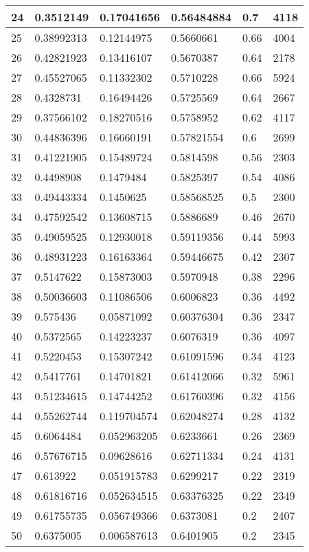 \begin{longtable}{|l|l|l|l|l|l|}
24 & 0.3512149 & 0.17041656 & 0.56484884 & 0.7 & 4118 \\ \hline 
25 & 0.38992313 & 0.12144975 & 0.5660661 & 0.66 & 4004 \\ \hline 
26 & 0.42821923 & 0.13416107 & 0.5670387 & 0.64 & 2178 \\ \hline 
27 & 0.45527065 & 0.11332302 & 0.5710228 & 0.66 & 5924 \\ \hline 
28 & 0.4328731 & 0.16494426 & 0.5725569 & 0.64 & 2667 \\ \hline 
29 & 0.37566102 & 0.18270516 & 0.5758952 & 0.62 & 4117 \\ \hline 
30 & 0.44836396 & 0.16660191 & 0.57821554 & 0.6 & 2699 \\ \hline 
31 & 0.41221905 & 0.15489724 & 0.5814598 & 0.56 & 2303 \\ \hline 
32 & 0.4498908 & 0.1479484 & 0.5825397 & 0.54 & 4086 \\ \hline 
33 & 0.49443334 & 0.1450625 & 0.58568525 & 0.5 & 2300 \\ \hline 
34 & 0.47592542 & 0.13608715 & 0.5886689 & 0.46 & 2670 \\ \hline 
35 & 0.49059525 & 0.12930018 & 0.59119356 & 0.44 & 5993 \\ \hline 
36 & 0.48931223 & 0.16163364 & 0.59446675 & 0.42 & 2307 \\ \hline 
37 & 0.5147622 & 0.15873003 & 0.5970948 & 0.38 & 2296 \\ \hline 
38 & 0.50036603 & 0.11086506 & 0.6006823 & 0.36 & 4492 \\ \hline 
39 & 0.575436 & 0.05871092 & 0.60376304 & 0.36 & 2347 \\ \hline 
40 & 0.5372565 & 0.14223237 & 0.6076319 & 0.36 & 4097 \\ \hline 
41 & 0.5220453 & 0.15307242 & 0.61091596 & 0.34 & 4123 \\ \hline 
42 & 0.5417761 & 0.14701821 & 0.61412066 & 0.32 & 5961 \\ \hline 
43 & 0.51234615 & 0.14744252 & 0.61760396 & 0.32 & 4156 \\ \hline 
44 & 0.55262744 & 0.119704574 & 0.62048274 & 0.28 & 4132 \\ \hline 
45 & 0.6064484 & 0.052963205 & 0.6233661 & 0.26 & 2369 \\ \hline 
46 & 0.57676715 & 0.09628616 & 0.62711334 & 0.24 & 4131 \\ \hline 
47 & 0.613922 & 0.051915783 & 0.6299217 & 0.22 & 2319 \\ \hline 
48 & 0.61816716 & 0.052634515 & 0.63376325 & 0.22 & 2349 \\ \hline 
49 & 0.61755735 & 0.056749366 & 0.6373081 & 0.2 & 2407 \\ \hline 
50 & 0.6375005 & 0.006587613 & 0.6401905 & 0.2 & 2345 \\ \hline 
\end{longtable}